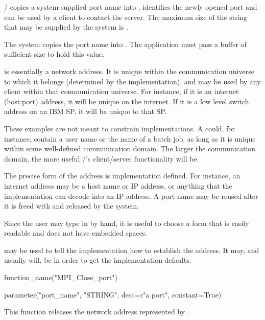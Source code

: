 \MPI/ copies a system-supplied port name into
. 
identifies the newly opened port and can be used by a client to contact the
server.  The maximum size of the string that may be supplied by the system is
.
\begin{users}
The system copies the port name into . The application
must pass a buffer of sufficient size to hold this value.
\end{users}

 is essentially a network address.
It is unique within the communication universe
to which it belongs (determined by the implementation),
and may be used by any client within that
communication universe.  For instance, if it is an internet
(host:port) address, it will be unique on the internet. If it is a low
level switch address on an IBM SP, it will be unique to that SP.
\begin{implementors}
These examples are not meant to constrain implementations.
A  could, for instance, contain a user name
or the name of a batch job, as long as  it is unique within
some well-defined communication domain. The larger the
communication domain, the more useful \MPI/'s client/server
functionality will be.
\end{implementors}
The precise form of the address is implementation defined. For
instance, an internet address may be a host name or IP address,
or anything that the implementation can decode into an IP address.
A port name may be reused after it is freed with
 and released by the system.

\begin{implementors}
Since the user may type in  by hand,
it is useful to choose a form that is easily readable
and does not have embedded spaces.
\end{implementors}


 may be used to tell the implementation
how to establish the address. It may, and usually will,
be  in order to get
the implementation defaults.

\begin{mpi-binding}
    function_name("MPI_Close_port")

    parameter("port_name", "STRING", desc=r"a port", constant=True)
\end{mpi-binding}

This function releases the network address represented by
.

